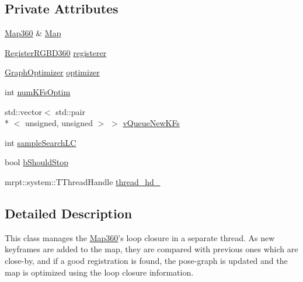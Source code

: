\subsection*{Private Attributes}
\begin{DoxyCompactItemize}
\item 
\hyperlink{structMap360}{Map360} \& \hyperlink{classLoopClosure360_a5b91cac06bfd29812943dfd042081e62}{Map}
\item 
\hyperlink{classRegisterRGBD360}{Register\-R\-G\-B\-D360} \hyperlink{classLoopClosure360_a1002d38ebe9e93238e8260096d85d87f}{registerer}
\item 
\hyperlink{classGraphOptimizer}{Graph\-Optimizer} \hyperlink{classLoopClosure360_a3cd0c08e2bb1a4588634aa4a2ca203a9}{optimizer}
\item 
int \hyperlink{classLoopClosure360_a5382c470b13df15c7e47c8d096c7d32f}{num\-K\-Fs\-Optim}
\item 
std\-::vector$<$ std\-::pair\\*
$<$ unsigned, unsigned $>$ $>$ \hyperlink{classLoopClosure360_ae1ffbca60947fcbede7b879eba8fff6d}{v\-Queue\-New\-K\-Fs}
\item 
int \hyperlink{classLoopClosure360_ab3ba4c9b0ccab41b5a93c4e61645df7f}{sample\-Search\-L\-C}
\item 
bool \hyperlink{classLoopClosure360_a3938681e7058a95a39cadc723388f1ad}{b\-Should\-Stop}
\item 
mrpt\-::system\-::\-T\-Thread\-Handle \hyperlink{classLoopClosure360_aff328ff138b4a58ca1efaf212e1c3606}{thread\-\_\-hd\-\_\-}
\end{DoxyCompactItemize}


\subsection{Detailed Description}
This class manages the \hyperlink{structMap360}{Map360}'s loop closure in a separate thread. As new keyframes are added to the map, they are compared with previous ones which are close-\/by, and if a good registration is found, the pose-\/graph is updated and the map is optimized using the loop closure information. 

